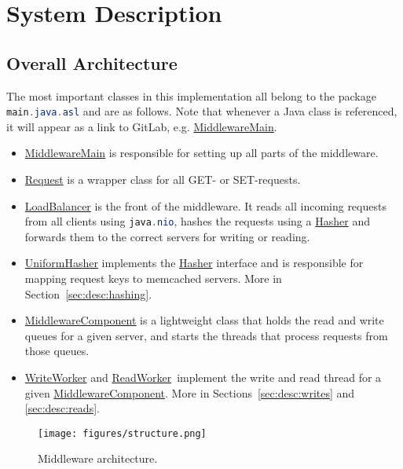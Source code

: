 \documentclass[11pt]{article}
\newcommand{\code}[1]{\lstinline[language=Java]{#1}}
\newcommand{\linkmain}[1]{\href{https://gitlab.inf.ethz.ch/pungast/asl-fall16-project/blob/master/src/main/java/asl/#1.java}{#1}}
\begin{document}
\section{System Description}\label{sec:system-description}

\subsection{Overall Architecture}\label{sec:desc:architecture}

The most important classes in this implementation all belong to the package \code{main.java.asl} and are as follows. Note that whenever a Java class is referenced, it will appear as a link to GitLab, e.g. \linkmain{MiddlewareMain}. 

\begin{itemize}
\item \linkmain{MiddlewareMain} is responsible for setting up all parts of the middleware.
\item \linkmain{Request} is a wrapper class for all GET- or SET-requests.
\item \linkmain{LoadBalancer} is the front of the middleware. It reads all incoming requests from all clients using \code{java.nio}, hashes the requests using a \linkmain{Hasher} and forwards them to the correct servers for writing or reading.
\item \linkmain{UniformHasher} implements the \linkmain{Hasher} interface and is responsible for mapping request keys to memcached servers. More in Section~\ref{sec:desc:hashing}.
\item \linkmain{MiddlewareComponent} is a lightweight class that holds the read and write queues for a given server, and starts the threads that process requests from those queues.
\item \linkmain{WriteWorker} and \linkmain{ReadWorker} implement the write and read thread for a given \linkmain{MiddlewareComponent}. More in Sections~\ref{sec:desc:writes} and \ref{sec:desc:reads}.
\end{itemize}

\begin{figure}[h]
\centering
\texttt{[image: figures/structure.png]}
\label{fig:structure}
\caption{Middleware architecture.}
\end{figure}
\end{document}
